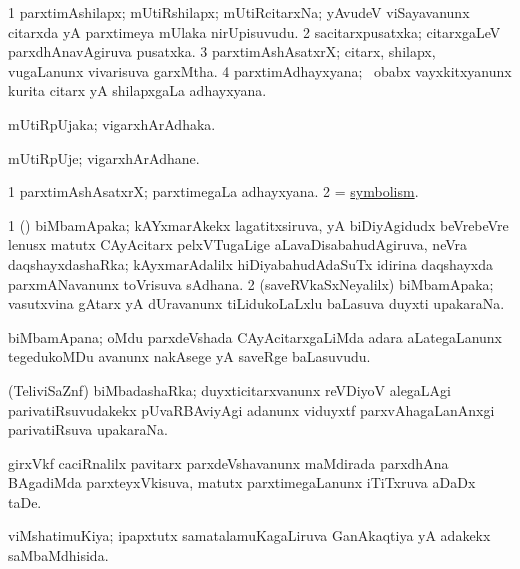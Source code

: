 \bentry
{}
\gl{\nA}
\bmng
\bnum
\num{1} parxtimAshilapx; mUtiRshilapx; mUtiRcitarxNa; yAvudeV viSayavanunx citarxda yA parxtimeya mUlaka nirUpisuvudu. 
\num{2} sacitarxpusatxka; citarxgaLeV parxdhAnavAgiruva pusatxka. 
\num{3} parxtimAshAsatxrX; citarx, shilapx, \mo vugaLanunx vivarisuva garxMtha. 
\num{4} parxtimAdhayxyana; \kanmu\ obabx vayxkitxyanunx kurita citarx yA shilapxgaLa adhayxyana. 
\enum
\emng
\eentry

\bentry
{}
\gl{\nA}
\bmng
mUtiRpUjaka; vigarxhArAdhaka. 
\emng
\eentry

\bentry
{}
\gl{\nA}
\bmng
mUtiRpUje; vigarxhArAdhane. 
\emng
\eentry

\bentry
{}
\gl{\nA}
\bmng
\bnum
\num{1} parxtimAshAsatxrX; parxtimegaLa adhayxyana. 
\num{2} = \hyperref{kandict_s.pdf}{S}{symbolism}{symbolism}. 
\enum
\emng
\eentry

\bentry
{}
\gl{\nA}
\bmng
\bnum
\num{1} (\CA) biMbamApaka; kAYxmarAkekx lagatitxsiruva, yA biDiyAgidudx beVrebeVre lenusx matutx CAyAcitarx pelxVTugaLige aLavaDisabahudAgiruva, neVra daqshayxdashaRka; kAyxmarAdalilx hiDiyabahudAdaSuTx idirina daqshayxda parxmANavanunx toVrisuva sAdhana. 
\num{2} (saveRVkaSxNeyalilx) biMbamApaka; vasutxvina gAtarx yA dUravanunx tiLidukoLaLxlu baLasuva duyxti upakaraNa. 
\enum
\emng
\eentry

\bentry
{}
\gl{\nA}
\bmng
biMbamApana; oMdu parxdeVshada CAyAcitarxgaLiMda adara aLategaLanunx tegedukoMDu avanunx nakAsege yA saveRge baLasuvudu. 
\emng
\eentry

\bentry
{}
\gl{\nA}
\bmng
(TeliviSaZnf) biMbadashaRka; duyxticitarxvanunx reVDiyoV alegaLAgi parivatiRsuvudakekx pUvaRBAviyAgi adanunx viduyxtf parxvAhagaLanAnxgi parivatiRsuva upakaraNa. 
\emng
\eentry

\bentry
{}
\gl{\nA}
\bmng
girxVkf caciRnalilx pavitarx parxdeVshavanunx maMdirada parxdhAna BAgadiMda parxteyxVkisuva, matutx parxtimegaLanunx iTiTxruva aDaDx taDe. 
\emng
\eentry

\bentry
{}
\gl{\gu}
\bmng
viMshatimuKiya; ipapxtutx samatalamuKagaLiruva GanAkaqtiya yA adakekx saMbaMdhisida. 
\emng
\eentry

